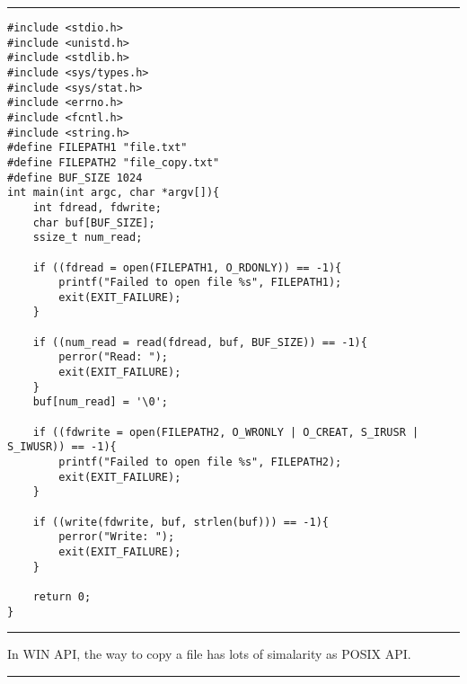 \documentclass[10pt,draftclsnofoot,onecolumn,journal,compsoc]{IEEEtran}
\begin{document}
\noindent\rule{15.5cm}{0.4pt}
\begin{verbatim}
#include <stdio.h>
#include <unistd.h>
#include <stdlib.h>
#include <sys/types.h>
#include <sys/stat.h>
#include <errno.h>
#include <fcntl.h>
#include <string.h>
#define FILEPATH1 "file.txt"
#define FILEPATH2 "file_copy.txt"
#define BUF_SIZE 1024
int main(int argc, char *argv[]){
    int fdread, fdwrite;
    char buf[BUF_SIZE];
    ssize_t num_read;
    
    if ((fdread = open(FILEPATH1, O_RDONLY)) == -1){
        printf("Failed to open file %s", FILEPATH1);
        exit(EXIT_FAILURE);
    }
    
    if ((num_read = read(fdread, buf, BUF_SIZE)) == -1){
        perror("Read: ");
        exit(EXIT_FAILURE);
    }
    buf[num_read] = '\0';
    
    if ((fdwrite = open(FILEPATH2, O_WRONLY | O_CREAT, S_IRUSR | S_IWUSR)) == -1){
        printf("Failed to open file %s", FILEPATH2);
        exit(EXIT_FAILURE);
    }
    
    if ((write(fdwrite, buf, strlen(buf))) == -1){
        perror("Write: ");
        exit(EXIT_FAILURE);
    }
    
    return 0;
}
\end{verbatim}
\noindent\rule{15.5cm}{0.4pt}
In WIN API, the way to copy a file has lots of simalarity as POSIX API. \par
\noindent\rule{15.5cm}{0.4pt}
\end{document}
